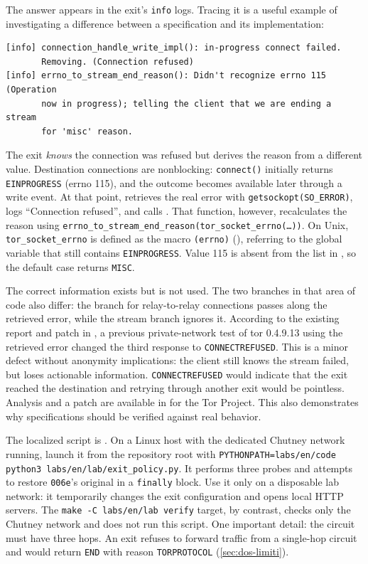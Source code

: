\begin{approfondimento}
The answer appears in the exit's \texttt{info} logs. Tracing it is a useful example of investigating a difference between a specification and its implementation:
\begin{lstlisting}[numbers=none]
[info] connection_handle_write_impl(): in-progress connect failed.
       Removing. (Connection refused)
[info] errno_to_stream_end_reason(): Didn't recognize errno 115 (Operation
       now in progress); telling the client that we are ending a stream
       for 'misc' reason.
\end{lstlisting}
The exit \emph{knows} the connection was refused but derives the reason from a different value. Destination connections are nonblocking: \texttt{connect()} initially returns \texttt{EINPROGRESS} (errno 115), and the outcome becomes available later through a write event. At that point,  retrieves the real error with \texttt{getsockopt(SO\_ERROR)}, logs \enquote{Connection refused}, and calls . That function, however, recalculates the reason using \texttt{errno\_to\_stream\_end\_reason(tor\_socket\_errno(\ldots))}. On Unix, \texttt{tor\_socket\_errno} is defined as the macro \texttt{(errno)} (), referring to the global variable that still contains \texttt{EINPROGRESS}. Value 115 is absent from the list in , so the default case returns \texttt{MISC}.

The correct information exists but is not used. The two branches in that area of code also differ: the branch for relay-to-relay connections passes along the retrieved error, while the stream branch ignores it. According to the existing report and patch in , a previous private-network test of tor 0.4.9.13 using the retrieved error changed the third response to \texttt{CONNECTREFUSED}. This is a minor defect without anonymity implications: the client still knows the stream failed, but loses actionable information. \texttt{CONNECTREFUSED} would indicate that the exit reached the destination and retrying through another exit would be pointless. Analysis and a patch are available in  for the Tor Project. This also demonstrates why specifications should be verified against real behavior.
\end{approfondimento}

The localized script is . On a Linux host with the dedicated Chutney network running, launch it from the repository root with \texttt{PYTHONPATH=labs/en/code python3 labs/en/lab/exit\_policy.py}. It performs three probes and attempts to restore \texttt{006e}'s original  in a \texttt{finally} block. Use it only on a disposable lab network: it temporarily changes the exit configuration and opens local HTTP servers. The \texttt{make -C labs/en/lab verify} target, by contrast, checks only the Chutney network and does not run this script. One important detail: the circuit must have three hops. An exit refuses to forward traffic from a single-hop circuit and would return \texttt{END} with reason \texttt{TORPROTOCOL} (\cref{sec:dos-limiti}).

